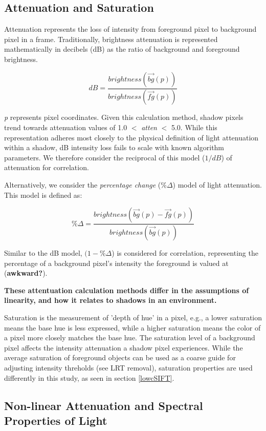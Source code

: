 \documentclass[12pt]{report}
\begin{document}
\subsection{Attenuation and Saturation}

Attenuation represents the loss of intensity from foreground pixel to background pixel in a frame. Traditionally, brightness attenuation is represented mathematically in decibels (dB) as the ratio of background and foreground brightness.

\begin{equation}
dB = \dfrac{brightness(\vec{bg}(p))}{brightness(\vec{fg}(p))}
\end{equation}

\textit{p} represents pixel coordinates. Given this calculation method, shadow pixels trend towards attenuation values of 1.0 $<$ \textit{atten} $<$ 5.0. While this representation adheres most closely to the physical definition of light attenuation within a shadow, dB intensity loss fails to scale with known algorithm parameters. We therefore consider the reciprocal of this model ($1/dB$) of attenuation for correlation.

Alternatively, we consider the \textit{percentage change} (\%$\Delta$) model of light attenuation. This model is defined as:

\begin{equation}
\%\Delta = \dfrac{brightness(\vec{bg}(p) - \vec{fg}(p))}{brightness(\vec{bg}(p))}
\end{equation}

Similar to the dB model, $(1 - \%\Delta$) is considered for correlation, representing the percentage of a background pixel's intensity the foreground is valued at (\textbf{awkward?}).

\textbf{These attentuation calculation methods differ in the assumptions of linearity, and how it relates to shadows in an environment.}

Saturation is the measurement of 'depth of hue' in a pixel, e.g., a lower saturation means the base hue is less expressed, while a higher saturation means the color of a pixel more closely matches the base hue. The saturation level of a background pixel affects the intensity attenuation a shadow pixel experiences. While the average saturation of foreground objects can be used as a coarse guide for adjusting intensity threholds (see LRT removal), saturation properties are used differently in this study, as seen in section \ref{lowcSIFT}.

\subsection{Non-linear Attenuation and Spectral Properties of Light}
\end{document}
